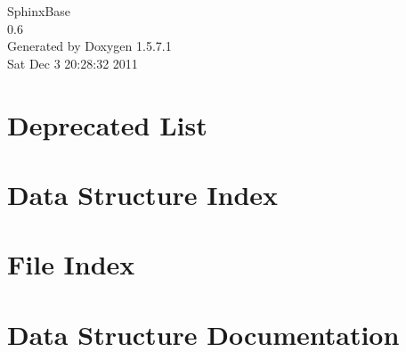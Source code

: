 \documentclass[letterpaper]{book}
\begin{document}
\begin{titlepage}
\vspace*{7cm}
\begin{center}
{\Large SphinxBase \\[1ex]\large 0.6 }\\
\vspace*{1cm}
{\large Generated by Doxygen 1.5.7.1}\\
\vspace*{0.5cm}
{\small Sat Dec 3 20:28:32 2011}\\
\end{center}
\end{titlepage}
\clearemptydoublepage
{}
\tableofcontents
\clearemptydoublepage
{}
\chapter{Deprecated List}
\label{deprecated}

\chapter{Data Structure Index}

\chapter{File Index}

\chapter{Data Structure Documentation}







































\end{document}
